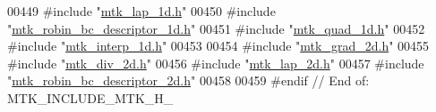 \begin{DoxyCode}
00449 \textcolor{preprocessor}{#include "\hyperlink{mtk__lap__1d_8h}{mtk\_lap\_1d.h}"}
00450 \textcolor{preprocessor}{#include "\hyperlink{mtk__robin__bc__descriptor__1d_8h}{mtk\_robin\_bc\_descriptor\_1d.h}"}
00451 \textcolor{preprocessor}{#include "\hyperlink{mtk__quad__1d_8h}{mtk\_quad\_1d.h}"}
00452 \textcolor{preprocessor}{#include "\hyperlink{mtk__interp__1d_8h}{mtk\_interp\_1d.h}"}
00453 
00454 \textcolor{preprocessor}{#include "\hyperlink{mtk__grad__2d_8h}{mtk\_grad\_2d.h}"}
00455 \textcolor{preprocessor}{#include "\hyperlink{mtk__div__2d_8h}{mtk\_div\_2d.h}"}
00456 \textcolor{preprocessor}{#include "\hyperlink{mtk__lap__2d_8h}{mtk\_lap\_2d.h}"}
00457 \textcolor{preprocessor}{#include "\hyperlink{mtk__robin__bc__descriptor__2d_8h}{mtk\_robin\_bc\_descriptor\_2d.h}"}
00458 
00459 \textcolor{preprocessor}{#endif // End of: MTK\_INCLUDE\_MTK\_H\_}
\end{DoxyCode}
